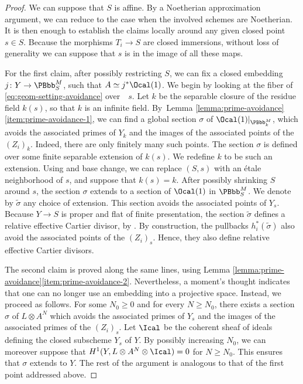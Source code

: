\begin{proof}
We can suppose that $S$ is affine. By a Noetherian approximation argument, we can reduce to the case when the involved schemes are Noetherian. It is then enough to establish the claims locally around any given closed point $s\in S$. Because the morphisms $T_{i}\to S$ are closed immersions, without loss of generality we can suppose that $s$ is in the image of all these maps.

For the first claim, after possibly restricting $S$, we can fix a closed embedding $j\colon Y\to\PBbb^{M}_{S}$, such that $A\simeq j^{\ast}\Ocal(1)$. We begin by looking at the fiber of \eqref{eq:geom-setting-avoidance} over~ $s$. Let $k$ be the separable closure of the residue field $k(s)$, so that $k$ is an infinite field. By~Lemma \ref{lemma:prime-avoidance}\eqref{item:prime-avoidance-1}, we can find a global section $\sigma$ of $\Ocal(1)|_{\PBbb^{M}_{k}}$, which avoids the associated primes of $Y_{k}$ and the images of the associated points of the $(Z_{i})_{k}$. Indeed, there are only finitely many such points. The section $\sigma$ is defined over some finite separable extension of $k(s)$. We redefine $k$ to be such an extension. Using \cite[\href{https://stacks.math.columbia.edu/tag/01ZM}{02LF}]{stacks-project} and base change, we can replace $(S,s)$ with an étale neighborhood of $s$, and suppose that $k(s)=k$. After possibly shrinking $S$ around $s$, the section $\sigma$ extends to a section of $\Ocal(1)$ in $\PBbb^{M}_{S}$. We denote by $\widetilde{\sigma}$ any choice of extension. This section avoids the associated points of $Y_{s}$. Because $Y\to S$ is proper and flat of finite presentation, the section $\widetilde{\sigma}$ defines a relative effective Cartier divisor, by \cite[Prop.\,11.3.7 \& Th.\,11.3.8]{EGAIV3}. By construction, the pullbacks $h_{i}^{\ast}(\widetilde{\sigma})$ also avoid the associated points of the $(Z_{i})_{s}$. Hence, they also define relative effective Cartier divisors.

The second claim is proved along the same lines, using Lemma \ref{lemma:prime-avoidance}\eqref{item:prime-avoidance-2}. Nevertheless, a moment's thought indicates that one can no longer use an embedding into a projective space. Instead, we proceed as follows. For some $N_{0}\geq 0$ and for every $N\geq N_{0}$, there exists a section $\sigma$ of $L\otimes A^{N}$ which avoids the associated primes of $Y_{s}$ and the images of the associated primes of the $(Z_{i})_{s}$. Let $\Ical$ be the coherent sheaf of ideals defining the closed subscheme $Y_{s}$ of $Y$. By possibly increasing $N_{0}$, we can moreover suppose that $H^{1}(Y, L\otimes A^{N}\otimes\Ical)=0$ for $N\geq N_{0}$. This ensures that $\sigma$ extends to $Y$. The rest of the argument is analogous to that of the first point addressed above.
\end{proof}

